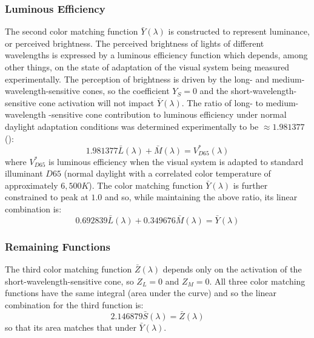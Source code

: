 \documentclass[twocolumn]{article}
\begin{document}
\subsubsection{Luminous Efficiency}
The second color matching function $\bar{Y}(\lambda)$ is constructed to represent luminance, or perceived brightness.  The perceived brightness of lights of different wavelengths is expressed by a luminous efficiency function which depends, among other things, on the state of adaptation of the visual system being measured experimentally.  The perception of brightness is driven by the long- and medium-wavelength-sensitive cones, so the coefficient $Y_S=0$ and the short-wavelength-sensitive cone activation will not impact $\bar{Y}(\lambda)$.  The ratio of long- to medium-wavelength -sensitive cone contribution to luminous efficiency under normal daylight adaptation conditions was determined experimentally to be $\approx1.981377$ (\cite{sharpe2011luminous}):
\begin{equation}
    1.981377\bar{L}(\lambda)+\bar{M}(\lambda)=V^*_{D65}(\lambda)
\end{equation}
where $V^*_{D65}$ is luminous efficiency when the visual system is adapted to standard illuminant $D65$ (normal daylight with a correlated color temperature of approximately $6,500K$).  The color matching function $\bar{Y}(\lambda)$ is further constrained to peak at $1.0$ and so, while maintaining the above ratio, its linear combination is:
\begin{equation}
    0.692839\bar{L}(\lambda)+0.349676\bar{M}(\lambda)=\bar{Y}(\lambda)
\end{equation}
\subsubsection{Remaining Functions}
The third color matching function $\bar{Z}(\lambda)$ depends only on the activation of the short-wavelength-sensitive cone, so $Z_L=0$ and $Z_M=0$.  All three color matching functions have the same integral (area under the curve) and so the linear combination for the third function is:
\begin{equation}
    2.146879\bar{S}(\lambda)=\bar{Z}(\lambda)
\end{equation}
so that its area matches that under $\bar{Y}(\lambda)$.
\end{document}
